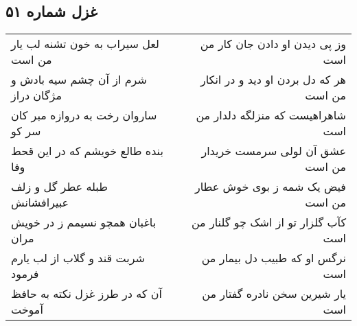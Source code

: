 \begin{center}
\section*{غزل شماره ۵۱}
\label{sec:sh051}
\begin{longtable}{l p{0.5cm} r}
لعل سیراب به خون تشنه لب یار من است
&&
وز پی دیدن او دادن جان کار من است
\\
شرم از آن چشم سیه بادش و مژگان دراز
&&
هر که دل بردن او دید و در انکار من است
\\
ساروان رخت به دروازه مبر کان سر کو
&&
شاهراهیست که منزلگه دلدار من است
\\
بنده طالع خویشم که در این قحط وفا
&&
عشق آن لولی سرمست خریدار من است
\\
طبله عطر گل و زلف عبیرافشانش
&&
فیض یک شمه ز بوی خوش عطار من است
\\
باغبان همچو نسیمم ز در خویش مران
&&
کآب گلزار تو از اشک چو گلنار من است
\\
شربت قند و گلاب از لب یارم فرمود
&&
نرگس او که طبیب دل بیمار من است
\\
آن که در طرز غزل نکته به حافظ آموخت
&&
یار شیرین سخن نادره گفتار من است
\\
\end{longtable}
\end{center}
